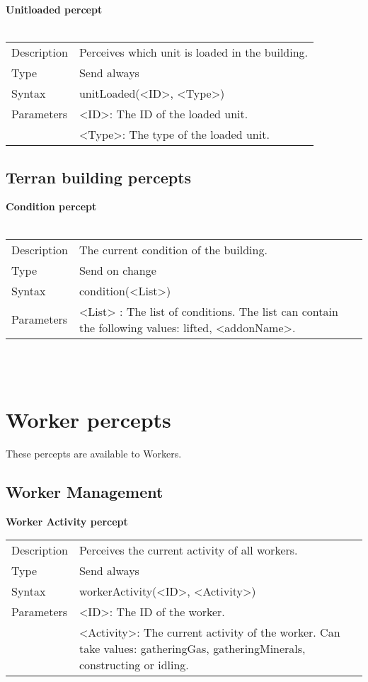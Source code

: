 \documentclass[english,11pt]{report}
\begin{document}
\noindent
\textbf{Unitloaded percept}\\
\\
\begin{tabularx}{\textwidth}{lX}
 Description & Perceives which unit is loaded in the building.\\
 Type & Send always \\
 Syntax & unitLoaded(<ID>, <Type>) \\
 Parameters &   <ID>: The ID of the loaded unit.\\
            & <Type>: The type of the loaded unit.
\end{tabularx}

\subsection{Terran building percepts}
\textbf{Condition percept}\\
\\
\begin{tabularx}{\textwidth}{lX}
 Description & The current condition of the building. \\
 Type & Send on change \\
 Syntax & condition(<List>) \\
 Parameters &  <List> : The list of conditions. The list can contain the following values: lifted, <addonName>. 
\end{tabularx}
\\
\\

\newpage
\section{Worker percepts}
These percepts are available to Workers.

\subsection{Worker Management}
\textbf{Worker Activity percept}
\\
\begin{tabularx}{\textwidth}{lX}
 Description & Perceives the current activity of all workers. \\
 Type & Send always \\
 Syntax & workerActivity(<ID>, <Activity>) \\
 Parameters &       <ID>: The ID of the worker. \\
            & <Activity>: The current activity of the worker. Can take values: gatheringGas, gatheringMinerals, constructing or idling.
\end{tabularx} \\
\end{document}
